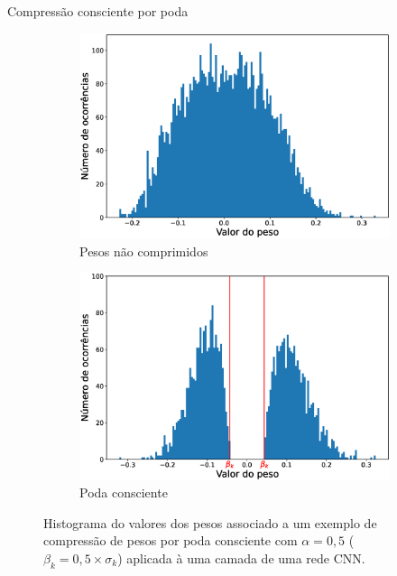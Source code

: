 \begin{frame}{Compressão consciente por poda}
    
\begin{figure}[H]
  \centering

  \begin{subfigure}[b]{0.49\textwidth}
    \includegraphics[width=\textwidth]{figuras/hist_weights.eps}
    \caption{Pesos não comprimidos}
    \label{fig:subfig1}
  \end{subfigure}
  \hfill
  \begin{subfigure}[b]{0.49\textwidth}
    \includegraphics[width=\textwidth]{figuras/hist_prune.eps}
    \caption{Poda consciente}
    \label{fig:subfig2}
  \end{subfigure}

  \caption{Histograma do valores dos pesos associado a um exemplo de compressão de pesos por poda consciente com $\alpha=0,5$  ($\beta_k=0,5 \times \sigma_k$) aplicada à uma camada de uma rede CNN.}
  \label{fig:main}
\end{figure}

\end{frame}


